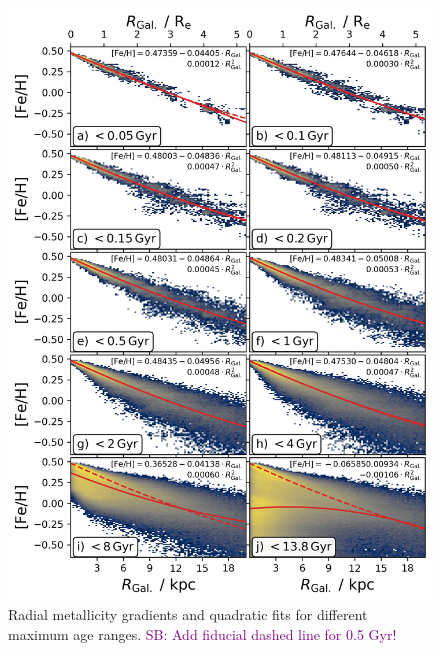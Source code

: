 \documentclass[fleqn,usenatbib]{mnras}
\newcommand{\SB}[1]{{\textcolor{purple}{SB: #1}}}
\begin{document}
\begin{figure}
    \centering
    \includegraphics[width=\columnwidth]{figures/quadratic_fit_across_maximum_ages.png}
    \caption{Radial metallicity gradients and quadratic fits for different maximum age ranges. \SB{Add fiducial dashed line for 0.5 Gyr!}}
    \label{fig:quadratic_fit_across_maximum_ages}
\end{figure}
\end{document}
